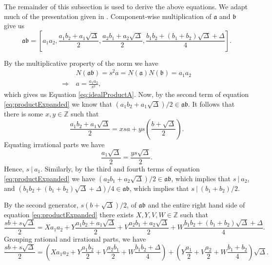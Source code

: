 \documentclass{ucalgthes1}
\theoremstyle{plain}
\theoremstyle{definition}
\newcommand{\ZZ}{\mathbb{Z}}
\begin{document}
The remainder of this subsection is used to derive the above equations.  We adapt much of the presentation given in \cite[pp.117,118]{Jacobson2009}. Component-wise multiplication of $\mathfrak a$ and $\mathfrak b$ give us
\begin{equation}
\label{eq:productExpanded}
\mathfrak{a} \mathfrak{b} =
\left[ a_1a_2, \frac{a_1b_2 + a_1\sqrt{\Delta}}{2}, \frac{a_2b_1 + a_2\sqrt{\Delta}}{2}, \frac{b_1b_2 + (b_1+b_2)\sqrt{\Delta} + \Delta}{4} \right].
\end{equation}

\noindent
By the multiplicative property of the norm we have
\begin{align*}
	& N(\mathfrak{a}\mathfrak{b}) = s^2a = N(\mathfrak{a})N(\mathfrak{b}) = a_1 a_2 \\
	\Rightarrow~ & a = \frac{a_1a_2}{s^2},
\end{align*}
which gives us Equation \ref{eq:idealProductA}. Now, by the second term of equation \eqref{eq:productExpanded} we know that $(a_1b_2 + a_1\sqrt{\Delta})/2 \in \mathfrak{a}\mathfrak{b}$.  It follows that there is some $x,y \in \ZZ$ such that
\[
	\frac{a_1b_2 + a_1\sqrt{\Delta}}{2} = xsa + ys\left(\frac{b+\sqrt{\Delta}}{2}\right).
\]
Equating irrational parts we have
\begin{equation*}
	\frac{a_1\sqrt{\Delta}}{2} = \frac{ys\sqrt{\Delta}}{2}.
\end{equation*}
\noindent
Hence, $s ~|~ a_1$.  Similarly, by the third and fourth terms of equation \eqref{eq:productExpanded} we have $(a_2b_1+a_2\sqrt{\Delta})/2 \in \mathfrak{a}\mathfrak{b}$, which implies that $s~|~a_2$, and $(b_1b_2 + (b_1+b_2)\sqrt{\Delta} + \Delta)/4 \in \mathfrak{a}\mathfrak{b}$, which implies that $s~|~(b_1+b_2)/2$. 

By the second generator, $s(b+\sqrt\Delta)/2$, of $\mathfrak{a}\mathfrak{b}$ and the entire right hand side of equation \eqref{eq:productExpanded} there exists $X, Y, V, W \in \ZZ$ such that
\[
\frac{sb+s\sqrt\Delta}{2} = Xa_1a_2 + Y\frac{a_1b_2+a_1\sqrt\Delta}{2} + V\frac{a_2b_1 + a_2\sqrt{\Delta}}{2} + W\frac{b_1b_2 + (b_1+b_2)\sqrt{\Delta} + \Delta}{4}.
\]
Grouping rational and irrational parts, we have
\begin{equation}
\label{eq:productSecond}
\frac{sb+s\sqrt\Delta}{2} = \left( Xa_1a_2 + Y\frac{a_1b_2}{2} + V\frac{a_2b_1}{2} + W\frac{b_1b_2 + \Delta}{4} \right) + \left(Y\frac{a_1}{2} + V\frac{a_2}{2} + W\frac{b_1+b_2}{4}\right)\sqrt\Delta. 
\end{equation}
\end{document}
